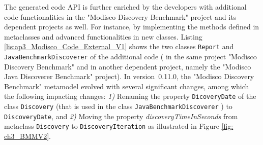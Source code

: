 The generated code API is further enriched by the developers with additional code functionalities in the "Modisco Discovery Benchmark" project and its dependent projects as well.
For instance, by implementing the methods defined in metaclasses and advanced functionalities in new classes.
Listing \ref{lis:ap3_Modisco_Code_External_V1} shows the two classes \texttt{Report} and \texttt{JavaBenchmarkDiscoverer} of the additional code ({\small{}} in the same project "Modisco Discovery Benchmark" and in another dependent project, namely the "Modisco Java Discoverer Benchmark" project).
%
%
%
%
In version~0.11.0, the "Modisco Discovery Benchmark" metamodel evolved with several significant changes, among which the following impacting changes: \emph{1)} Renaming the property \texttt{DicoveryDate} of the class \texttt{Discovery} (that is used in the class \texttt{JavaBenchmarkDiscoverer} ) to \texttt{DiscoveryDate}, and \emph{2)} Moving the property \emph{discoveryTimeInSeconds} from metaclass \texttt{Discovery} to \texttt{DiscoveryIteration} as illustrated in Figure \ref{fig: ch3_BMMV2}.




